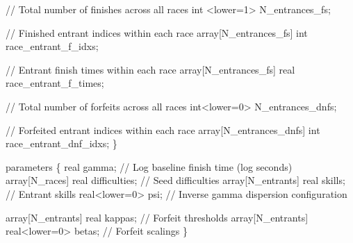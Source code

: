 \documentclass[
  letterpaper,
  DIV=11,
  numbers=noendperiod]{scrartcl}
\newenvironment{Shaded}{\begin{snugshade}}{\end{snugshade}}
\newcommand{\CommentTok}[1]{\textcolor[rgb]{0.37,0.37,0.37}{#1}}
\newcommand{\DataTypeTok}[1]{\textcolor[rgb]{0.68,0.00,0.00}{#1}}
\newcommand{\DecValTok}[1]{\textcolor[rgb]{0.68,0.00,0.00}{#1}}
\newcommand{\KeywordTok}[1]{\textcolor[rgb]{0.00,0.23,0.31}{#1}}
\newcommand{\NormalTok}[1]{\textcolor[rgb]{0.00,0.23,0.31}{#1}}
\begin{document}
\begin{codelisting}
\begin{Shaded}
\begin{Highlighting}[]
  \CommentTok{// Total number of finishes across all races}
  \DataTypeTok{int}\NormalTok{ \textless{}}\KeywordTok{lower}\NormalTok{=}\DecValTok{1}\NormalTok{\textgreater{} N\_entrances\_fs;}

  \CommentTok{// Finished entrant indices within each race}
  \DataTypeTok{array}\NormalTok{[N\_entrances\_fs] }\DataTypeTok{int}\NormalTok{ race\_entrant\_f\_idxs;}

  \CommentTok{// Entrant finish times within each race}
  \DataTypeTok{array}\NormalTok{[N\_entrances\_fs] }\DataTypeTok{real}\NormalTok{ race\_entrant\_f\_times;}

  \CommentTok{// Total number of forfeits across all races}
  \DataTypeTok{int}\NormalTok{\textless{}}\KeywordTok{lower}\NormalTok{=}\DecValTok{0}\NormalTok{\textgreater{} N\_entrances\_dnfs;}

  \CommentTok{// Forfeited entrant indices within each race}
  \DataTypeTok{array}\NormalTok{[N\_entrances\_dnfs] }\DataTypeTok{int}\NormalTok{ race\_entrant\_dnf\_idxs;}
\NormalTok{\}}

\KeywordTok{parameters}\NormalTok{ \{}
  \DataTypeTok{real}\NormalTok{ gamma;                       }\CommentTok{// Log baseline finish time (log seconds)}
  \DataTypeTok{array}\NormalTok{[N\_races] }\DataTypeTok{real}\NormalTok{ difficulties; }\CommentTok{// Seed difficulties}
  \DataTypeTok{array}\NormalTok{[N\_entrants] }\DataTypeTok{real}\NormalTok{ skills;    }\CommentTok{// Entrant skills}
  \DataTypeTok{real}\NormalTok{\textless{}}\KeywordTok{lower}\NormalTok{=}\DecValTok{0}\NormalTok{\textgreater{} psi;                }\CommentTok{// Inverse gamma dispersion configuration}

  \DataTypeTok{array}\NormalTok{[N\_entrants] }\DataTypeTok{real}\NormalTok{ kappas;         }\CommentTok{// Forfeit thresholds}
  \DataTypeTok{array}\NormalTok{[N\_entrants] }\DataTypeTok{real}\NormalTok{\textless{}}\KeywordTok{lower}\NormalTok{=}\DecValTok{0}\NormalTok{\textgreater{} betas; }\CommentTok{// Forfeit scalings}
\NormalTok{\}}


\end{Highlighting}
\end{Shaded}
\end{codelisting}
\end{document}
